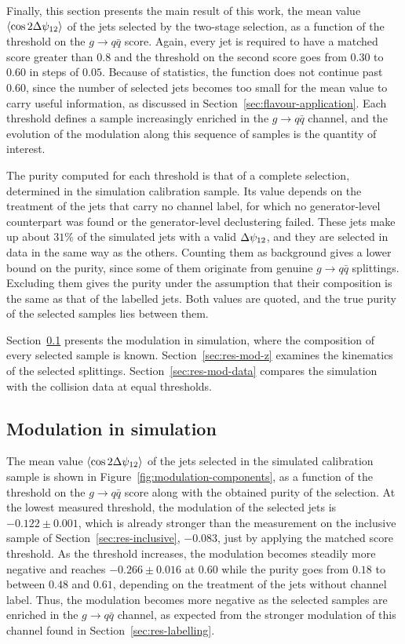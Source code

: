 Finally, this section presents the main result of this work, the mean value
$\langle \cos 2\Delta\psi_{12} \rangle$ of the jets selected by the two-stage selection, as a
function of the threshold on the $g \to q\bar{q}$ score. Again, every jet is required 
to have a matched score greater than $0.8$ and the threshold on the second score goes
from $0.30$ to $0.60$ in steps of $0.05$. Because of statistics, the function does not
continue past $0.60$, since the number of selected jets becomes too small 
for the mean value to carry useful information, as discussed in
Section~\ref{sec:flavour-application}. Each threshold defines a sample increasingly
enriched in the $g \to q\bar{q}$ channel, and the evolution of the modulation along
this sequence of samples is the quantity of interest.

The purity computed for each threshold is that of a complete selection, determined 
in the simulation calibration sample. Its value depends on the treatment
of the jets that carry no channel label, for which no generator-level counterpart
was found or the generator-level declustering failed. These jets make up about
$31\%$ of the simulated jets with a valid $\Delta\psi_{12}$, and they are selected in data in
the same way as the others. Counting them as background gives a lower bound on the
purity, since some of them originate from genuine $g \to q\bar{q}$ splittings.
Excluding them gives the purity under the assumption that their composition is the
same as that of the labelled jets. Both values are quoted, and the true purity of
the selected samples lies between them.

Section~\ref{sec:res-mod-sim} presents the modulation in simulation, where the
composition of every selected sample is known.
Section~\ref{sec:res-mod-z} examines the kinematics of the selected splittings.
Section~\ref{sec:res-mod-data} compares the simulation with the collision data at
equal thresholds.

\subsection{Modulation in simulation}
\label{sec:res-mod-sim}

The mean value $\langle \cos 2\Delta\psi_{12} \rangle$ of the jets selected in the simulated
calibration sample is shown in Figure~\ref{fig:modulation-components}, as a function
of the threshold on the $g \to q\bar{q}$ score along with the obtained purity of the selection.
At the lowest measured threshold, the modulation of the selected jets is $-0.122 \pm 0.001$,
which is already stronger than the measurement on the inclusive sample of
Section~\ref{sec:res-inclusive}, $-0.083$, just by applying the matched score threshold.
As the threshold increases, the modulation becomes steadily more
negative and reaches $-0.266 \pm 0.016$ at $0.60$ while the purity goes from 
$0.18$ to between $0.48$ and $0.61$, depending on the treatment of the
jets without channel label. Thus, the modulation becomes more negative as the selected
samples are enriched in the $g \to q\bar{q}$ channel, as expected from the stronger
modulation of this channel found in Section~\ref{sec:res-labelling}.

